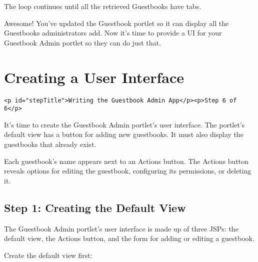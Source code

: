 The loop continues until all the retrieved Guestbooks have tabs.

Awesome! You've updated the Guestbook portlet so it can display all the
Guestbooks administrators add. Now it's time to provide a UI for your
Guestbook Admin portlet so they can do just that.

\chapter{Creating a User Interface}\label{creating-a-user-interface}

\begin{verbatim}
<p id="stepTitle">Writing the Guestbook Admin App</p><p>Step 6 of 6</p>
\end{verbatim}

It's time to create the Guestbook Admin portlet's user interface. The
portlet's default view has a button for adding new guestbooks. It must
also display the guestbooks that already exist.

Each guestbook's name appears next to an Actions button. The Actions
button reveals options for editing the guestbook, configuring its
permissions, or deleting it.

\section{Step 1: Creating the Default
View}\label{step-1-creating-the-default-view}

The Guestbook Admin portlet's user interface is made up of three JSPs:
the default view, the Actions button, and the form for adding or editing
a guestbook.

Create the default view first:

